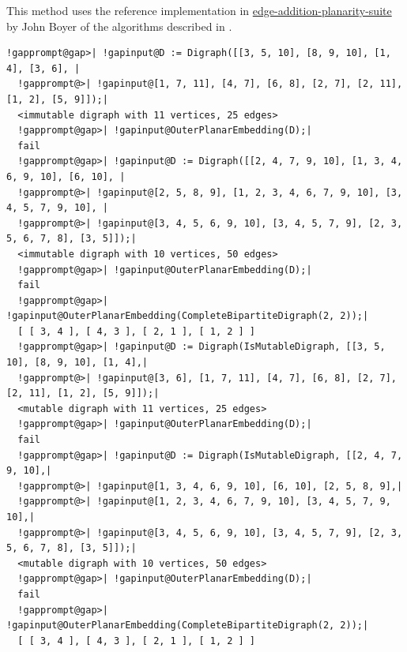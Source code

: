 \documentclass[a4paper,11pt]{report}
\begin{document}
{{{ This method uses the reference implementation in \href{https://github.com/graph-algorithms/edge-addition-planarity-suite} {edge-addition-planarity-suite}  by John Boyer of the algorithms described in \cite{BM06}. 
\begin{Verbatim}[commandchars=!@|,fontsize=\small,frame=single,label=Example]
  !gapprompt@gap>| !gapinput@D := Digraph([[3, 5, 10], [8, 9, 10], [1, 4], [3, 6], |
  !gapprompt@>| !gapinput@[1, 7, 11], [4, 7], [6, 8], [2, 7], [2, 11], [1, 2], [5, 9]]);|
  <immutable digraph with 11 vertices, 25 edges>
  !gapprompt@gap>| !gapinput@OuterPlanarEmbedding(D);|
  fail
  !gapprompt@gap>| !gapinput@D := Digraph([[2, 4, 7, 9, 10], [1, 3, 4, 6, 9, 10], [6, 10], |
  !gapprompt@>| !gapinput@[2, 5, 8, 9], [1, 2, 3, 4, 6, 7, 9, 10], [3, 4, 5, 7, 9, 10], |
  !gapprompt@>| !gapinput@[3, 4, 5, 6, 9, 10], [3, 4, 5, 7, 9], [2, 3, 5, 6, 7, 8], [3, 5]]);|
  <immutable digraph with 10 vertices, 50 edges>
  !gapprompt@gap>| !gapinput@OuterPlanarEmbedding(D);|
  fail
  !gapprompt@gap>| !gapinput@OuterPlanarEmbedding(CompleteBipartiteDigraph(2, 2));|
  [ [ 3, 4 ], [ 4, 3 ], [ 2, 1 ], [ 1, 2 ] ]
  !gapprompt@gap>| !gapinput@D := Digraph(IsMutableDigraph, [[3, 5, 10], [8, 9, 10], [1, 4],|
  !gapprompt@>| !gapinput@[3, 6], [1, 7, 11], [4, 7], [6, 8], [2, 7], [2, 11], [1, 2], [5, 9]]);|
  <mutable digraph with 11 vertices, 25 edges>
  !gapprompt@gap>| !gapinput@OuterPlanarEmbedding(D);|
  fail
  !gapprompt@gap>| !gapinput@D := Digraph(IsMutableDigraph, [[2, 4, 7, 9, 10],|
  !gapprompt@>| !gapinput@[1, 3, 4, 6, 9, 10], [6, 10], [2, 5, 8, 9],|
  !gapprompt@>| !gapinput@[1, 2, 3, 4, 6, 7, 9, 10], [3, 4, 5, 7, 9, 10],|
  !gapprompt@>| !gapinput@[3, 4, 5, 6, 9, 10], [3, 4, 5, 7, 9], [2, 3, 5, 6, 7, 8], [3, 5]]);|
  <mutable digraph with 10 vertices, 50 edges>
  !gapprompt@gap>| !gapinput@OuterPlanarEmbedding(D);|
  fail
  !gapprompt@gap>| !gapinput@OuterPlanarEmbedding(CompleteBipartiteDigraph(2, 2));|
  [ [ 3, 4 ], [ 4, 3 ], [ 2, 1 ], [ 1, 2 ] ]
\end{Verbatim}
 }

 

}}
\end{document}
